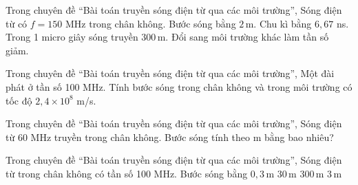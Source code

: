 

\begin{ex}
Trong chuyên đề “Bài toán truyền sóng điện từ qua các môi trường”, Sóng điện từ có $f=150$ MHz trong chân không.
\choiceTF
{\True Bước sóng bằng $2\,\text{m}$.}
{\True Chu kì bằng $6,67$ ns.}
{\True Trong 1 micro giây sóng truyền $300\,\text{m}$.}
{Đổi sang môi trường khác làm tần số giảm.}
\end{ex}

\begin{ex}
Trong chuyên đề “Bài toán truyền sóng điện từ qua các môi trường”, Một đài phát ở tần số 100 MHz. Tính bước sóng trong chân không và trong môi trường có tốc độ $2,4\times10^8$ m/s.
\choiceTF

\end{ex}

\begin{ex}
Trong chuyên đề “Bài toán truyền sóng điện từ qua các môi trường”, Sóng điện từ 60 MHz truyền trong chân không. Bước sóng tính theo m bằng bao nhiêu?
\end{ex}

\begin{ex}
Trong chuyên đề “Bài toán truyền sóng điện từ qua các môi trường”, Sóng điện từ trong chân không có tần số 100 MHz. Bước sóng bằng
\choice
{$0,3\,\text{m}$}
{$30\,\text{m}$}
{$300\,\text{m}$}
{\True $3\,\text{m}$}
\end{ex}

